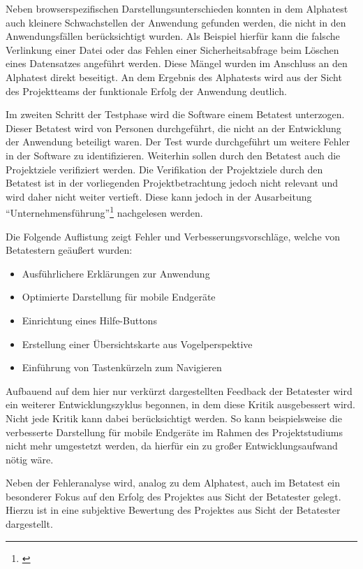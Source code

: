 Neben browserspezifischen Darstellungsunterschieden konnten in dem Alphatest
auch kleinere Schwachstellen der Anwendung gefunden werden, die nicht in den
Anwendungsfällen berücksichtigt wurden. Als Beispiel hierfür kann die falsche
Verlinkung einer Datei oder das Fehlen einer Sicherheitsabfrage beim Löschen
eines Datensatzes angeführt werden. Diese Mängel wurden im Anschluss an den
Alphatest direkt beseitigt. An dem Ergebnis des Alphatests wird aus der Sicht
des Projektteams der funktionale Erfolg der Anwendung deutlich.

Im zweiten Schritt der Testphase wird die Software einem Betatest unterzogen.
Dieser Betatest wird von Personen durchgeführt, die nicht an der Entwicklung der
Anwendung beteiligt waren. Der Test wurde durchgeführt um weitere Fehler in der
Software zu identifizieren. Weiterhin sollen durch den Betatest auch die
Projektziele verifiziert werden. Die Verifikation der Projektziele durch den
Betatest ist in der vorliegenden Projektbetrachtung jedoch nicht relevant und
wird daher nicht weiter vertieft. Diese kann jedoch in der Ausarbeitung
"`Unternehmensführung"'\footnote{\citet{unternehmensfuehrung2014}} nachgelesen
werden. 

Die Folgende Auflistung zeigt Fehler und Verbesserungsvorschläge, welche von
Betatestern geäußert wurden:

\begin{itemize}
  \item Ausführlichere Erklärungen zur Anwendung
  \item Optimierte Darstellung für mobile Endgeräte
  \item Einrichtung eines Hilfe-Buttons
  \item Erstellung einer Übersichtskarte aus Vogelperspektive
  \item Einführung von Tastenkürzeln zum Navigieren
\end{itemize}

Aufbauend auf dem hier nur verkürzt dargestellten Feedback der Betatester wird
ein weiterer Entwicklungszyklus begonnen, in dem diese Kritik ausgebessert wird.
Nicht jede Kritik kann dabei berücksichtigt werden. So kann beispielsweise die
verbesserte Darstellung für mobile Endgeräte im Rahmen des Projektstudiums nicht
mehr umgestetzt werden, da hierfür ein zu großer Entwicklungsaufwand nötig wäre.

Neben der Fehleranalyse wird, analog zu dem Alphatest, auch im Betatest ein
besonderer Fokus auf den Erfolg des Projektes aus Sicht der Betatester gelegt.
Hierzu ist in  eine subjektive Bewertung des Projektes aus
Sicht der Betatester dargestellt.

